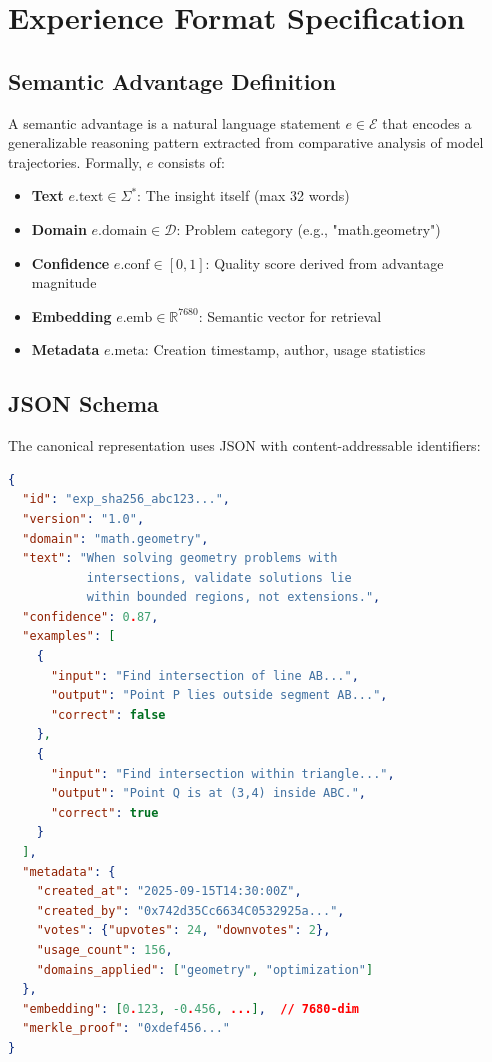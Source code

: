 \section{Experience Format Specification}

\label{sec:format}

\subsection{Semantic Advantage Definition}

\begin{definition}
A semantic advantage is a natural language statement $e \in \mathcal{E}$ that encodes a generalizable reasoning pattern extracted from comparative analysis of model trajectories. Formally, $e$ consists of:

\begin{itemize}
    \item \textbf{Text} $e.\text{text} \in \Sigma^*$: The insight itself (max 32 words)
    \item \textbf{Domain} $e.\text{domain} \in \mathcal{D}$: Problem category (e.g., "math.geometry")
    \item \textbf{Confidence} $e.\text{conf} \in [0,1]$: Quality score derived from advantage magnitude
    \item \textbf{Embedding} $e.\text{emb} \in \mathbb{R}^{7680}$: Semantic vector for retrieval
    \item \textbf{Metadata} $e.\text{meta}$: Creation timestamp, author, usage statistics
\end{itemize}
\end{definition}

\subsection{JSON Schema}

The canonical representation uses JSON with content-addressable identifiers:

\begin{lstlisting}[language=json,caption=Experience JSON Schema,label=lst:schema]
{
  "id": "exp_sha256_abc123...",
  "version": "1.0",
  "domain": "math.geometry",
  "text": "When solving geometry problems with 
           intersections, validate solutions lie 
           within bounded regions, not extensions.",
  "confidence": 0.87,
  "examples": [
    {
      "input": "Find intersection of line AB...",
      "output": "Point P lies outside segment AB...",
      "correct": false
    },
    {
      "input": "Find intersection within triangle...",
      "output": "Point Q is at (3,4) inside ABC.",
      "correct": true
    }
  ],
  "metadata": {
    "created_at": "2025-09-15T14:30:00Z",
    "created_by": "0x742d35Cc6634C0532925a...",
    "votes": {"upvotes": 24, "downvotes": 2},
    "usage_count": 156,
    "domains_applied": ["geometry", "optimization"]
  },
  "embedding": [0.123, -0.456, ...],  // 7680-dim
  "merkle_proof": "0xdef456..."
}
\end{lstlisting}

